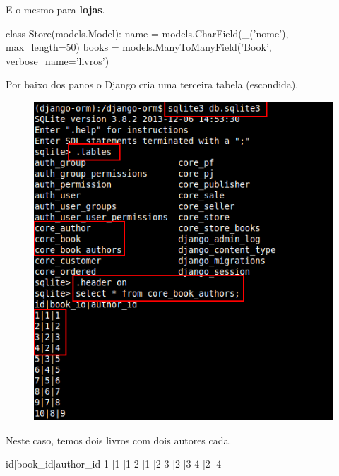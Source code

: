 \documentclass{beamer}
\begin{document}
{\begin{frame}[fragile]
\end{frame}


\begin{frame}[fragile]
	
E o mesmo para \textbf{lojas}.

\begin{pythoncode}
class Store(models.Model):
    name = models.CharField(_('nome'), max_length=50)
    books = models.ManyToManyField('Book', verbose_name='livros')
\end{pythoncode}

\end{frame}

\begin{frame}
	
Por baixo dos panos o Django cria uma terceira tabela (escondida).

	\begin{figure}[h]
	  \centering
  		\includegraphics[height=.75\paperheight]{img/sqlite01}
	\end{figure}

Neste caso, temos dois livros com dois autores cada.
\end{frame}

\begin{frame}[fragile]

\begin{bashcode}
id|book_id|author_id
1 |1	  	  |1
2 |1	  	  |2
3 |2	  	  |3
4 |2	  	  |4
\end{bashcode}


\end{frame}}
\end{document}
